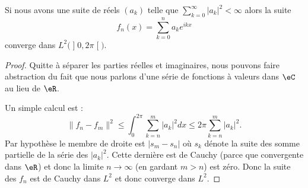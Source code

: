 \begin{proposition}
    Si nous avons une suite de réels \( (a_k)\) telle que \( \sum_{k=0}^{\infty}| a_k |^2<\infty\) alors la suite
    \begin{equation}
        f_n(x)=\sum_{k=0}^na_k e^{ikx}
    \end{equation}
    converge dans \( L^2\big( \mathopen] 0 , 2\pi \mathclose[ \big)\).
\end{proposition}

\begin{proof}
    Quitte à séparer les parties réelles et imaginaires, nous pouvons faire abstraction du fait que nous parlons d'une série de fonctions à valeurs dans \( \eC\) au lieu de \( \eR\).

    Un simple calcul est :
    \begin{equation}    \label{EqHVdJxZT}
        \| f_n-f_m \|^2\leq\int_0^{2\pi}\sum_{k=n}^m| a_k |^2dx\leq 2\pi\sum_{k=n}^m| a_k |^2.
    \end{equation}
    Par hypothèse le membre de droite est \( | s_m-s_n |\) où \( s_k\) dénote la suite des somme partielle de la série des \( | a_k |^2\). Cette dernière est de Cauchy (parce que convergente dans \( \eR\)) et donc la limite \( n\to\infty\) (en gardant \( m>n\)) est zéro. Donc la suite des \( f_n\) est de Cauchy dans \( L^2\) et donc converge dans \( L^2\).
\end{proof}

